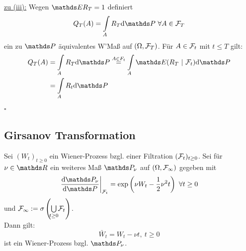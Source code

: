 \uline{zu (iii):}
Wegen $\E R_T=1$ definiert
\[
Q_T(A)=\int\ablim{A}R_T\dint\Pw~\forall A\in \F_T
\]
ein zu $\Pw$ äquivalentes W'Maß auf $(\Omega,\mathcal{F}_T)$.
Für $A\in \mathcal{F}_t$ mit $t\le T$ gilt:
\begin{equation*}
\begin{aligned}
	Q_T(A) &= \int\ablim{A}R_T\dint\Pw \stackrel{A\in F_t}{=} \int\ablim{A}\E(R_T~|~\F_t)\dint\Pw\\
	&= \int\ablim{A}R_t\dint\Pw
\end{aligned}
\end{equation*}
\hfill $\square$

\subsection{Girsanov Transformation}
\label{sub:girsanov_transformation}
Sei $(W_t)_{t\ge 0}$ ein Wiener-Prozess bzgl. einer Filtration $(\mathcal{F}_t)_{t\ge0}$.
Sei für $\nu\in \R$ ein weiteres Maß $\Pw_\nu$ auf $(\Omega,\mathcal{F}_\infty)$ gegeben mit
\[
\left.\frac{\dint\Pw_\nu}{\dint \Pw}\right|_{\F_t}=\exp\enbrace{\nu W_t-\frac{1}{2}\nu^2t}~\forall t\ge0
\]
und $\F_\infty:=\sigma\enbrace{\bigcup\ablim{t\ge0}\F_t}$.\\
Dann gilt:
\[
\bar{W}_t=W_t-\nu t,~t\ge 0
\]
ist ein Wiener-Prozess bzgl. $\Pw_\nu$.\\


